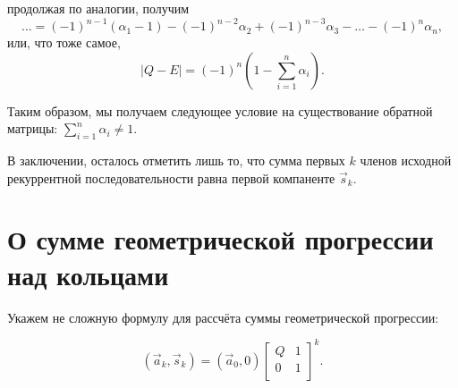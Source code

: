 \documentclass[draft]{article}
\begin{document}
продолжая по аналогии, получим
\[
  \ldots = (-1)^{n-1}(\alpha_1 - 1) - (-1)^{n-2}\alpha_2 + (-1)^{n-3}\alpha_3 - \ldots - (-1)^{n}\alpha_n,
\]
или, что тоже самое,
\[
|Q - E| = (-1)^{n} (1 - \sum_{i=1}^{n}\alpha_i).
\]

Таким образом, мы получаем следующее условие на существование обратной матрицы: $\sum_{i=1}^{n}\alpha_i \not= 1$.


В заключении, осталось отметить лишь то, что сумма первых $k$ членов исходной рекуррентной последовательности равна первой компаненте $\vec{s}_k$.


\section{О сумме геометрической прогрессии над кольцами}

Укажем не сложную формулу для рассчёта суммы геометрической прогрессии:

\begin{displaymath}
  (\vec{a}_{k}, \vec{s}_{k}) = (\vec{a}_0, 0) \left[
  \begin{array}{cc}
    Q & 1 \\
    0 & 1 \\
  \end{array}
  \right] ^ k.
\end{displaymath}
\end{document}

